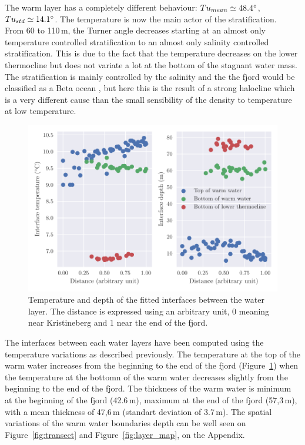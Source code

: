 \documentclass[12pt,a4paper]{article}
\begin{document}
The warm layer has a completely different behaviour:
$Tu_{mean} \simeq 48.4^{\circ}$, $Tu_{std} \simeq 14.1^{\circ}$.
The temperature is now the main actor of the stratification.\\
From 60 to 110\,m, the Turner angle decreases starting at an almost
only temperature controlled stratification to an almost only salinity controlled
stratification. This is due to the fact that the temperature decreases
on the lower thermocline but does not variate a lot at the bottom
of the stagnant water mass.\\
The stratification is mainly controlled by the salinity
and the the fjord would be classified as a Beta ocean
\citep{carmack2007}, but here this is the result of a strong halocline
which is a very different cause than the small sensibility of the density
to temperature at low temperature.

\begin{figure}[h]
  \centering
  \includegraphics{layers}
  \caption{\label{fig:layers}Temperature and depth of the fitted interfaces
    between the water layer. The distance is expressed using an arbitrary unit,
    0 meaning near Kristineberg and 1 near the end of the fjord.}
\end{figure}
The interfaces between each water layers have been computed using
the temperature variations as described previously.
The temperature at the top of the warm water
increases from the beginning to the end of the fjord (Figure~\ref{fig:layers}) when
the temperature at the bottomn of the warm water
decreases slightly from the beginning to the end of the fjord.
The thickness of the warm water is minimum at the beginning of the fjord (42.6\,m),
maximum at the end of the fjord (57,3\,m), with a mean thickness of 47,6\,m
(standart deviation of 3.7\,m).
The spatial variations of the warm water boundaries depth can be
well seen on
Figure~\ref{fig:transect} and Figure~\ref{fig:layer_map}, on the Appendix.
\end{document}
